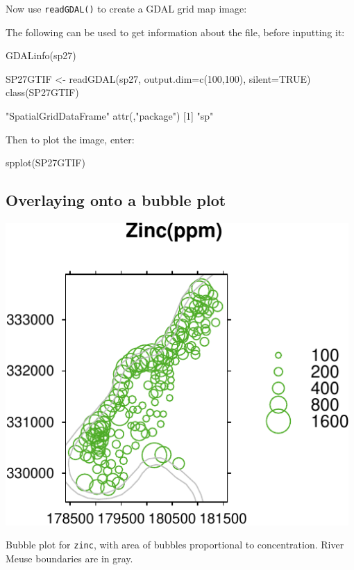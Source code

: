 \documentclass{tufte-book}\usepackage[]{graphicx}\usepackage[]{color}
\newcommand{\txtt}[1]{\texttt{#1}}
\newcommand{\margtt}[1]{{\footnotesize \texttt{#1}}}
\begin{document}
Now use \txtt{readGDAL()} to create a GDAL grid map image:
\begin{marginfigure}
The following can be used to get information about the file,
before inputting it:
\begin{Schunk}
\begin{Sinput}
GDALinfo(sp27)
\end{Sinput}
\end{Schunk}
\end{marginfigure}
\begin{Schunk}
\begin{Sinput}
SP27GTIF <- readGDAL(sp27, output.dim=c(100,100),
                     silent=TRUE)
class(SP27GTIF)
\end{Sinput}
\begin{Soutput}
[1] "SpatialGridDataFrame"
attr(,"package")
[1] "sp"
\end{Soutput}
\end{Schunk}
Then to plot the image, enter:
\begin{Schunk}
\begin{Sinput}
spplot(SP27GTIF)
\end{Sinput}
\end{Schunk}

\subsection{Overlaying onto a bubble plot}

\begin{marginfigure}
\begin{Schunk}


\centerline{\includegraphics[width=0.98\textwidth]{figs/10-meuse-bubble-1} }

\end{Schunk}
\vspace*{3pt}
 \caption{Bubble plot for \margtt{zinc},
with area of bubbles proportional to concentration.
River Meuse boundaries are in gray.\label{fig:ZnRiv}}
\end{marginfigure}
\end{document}
